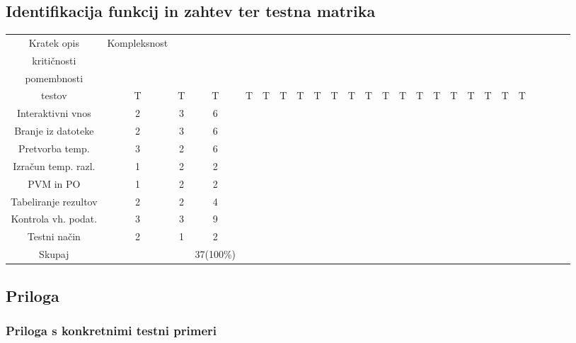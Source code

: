 \documentclass[a4paper,12pt]{article}
\begin{document}
	\begin{landscape}
		\subsection{Identifikacija funkcij in zahtev ter testna matrika}
			\footnotesize
			\centering
			\begin{tabular}{|c|c|c|c|c||c|c|c|c|c|c|c|c|c|c|c|c|c|c|c|c|c|c|c|c|}
			\hline
					Kratek opis&Kompleksnost&\thead{Stopnja \\  kritičnosti}&\thead{Indikator \\ pomembnosti}&\thead{Število \\ testov}
					&T&T&T&T&T&T&T&T&T&T&T&T&T&T&T&T&T&T&T&T\\
			\hline
				Interaktivni vnos&2&3&6&&&&&&&&&&&&&&&&&&&&&\\
				\hline
				Branje iz datoteke&2&3&6&&&&&&&&&&&&&&&&&&&&&\\
				\hline
				Pretvorba temp.&3&2&6&&&&&&&&&&&&&&&&&&&&&\\
				\hline
				Izračun temp. razl.&1&2&2&&&&&&&&&&&&&&&&&&&&&\\
				\hline
				PVM in PO&1&2&2&&&&&&&&&&&&&&&&&&&&&\\
				\hline
				Tabeliranje rezultov&2&2&4&&&&&&&&&&&&&&&&&&&&&\\
				\hline
				Kontrola vh. podat.&3&3&9&&&&&&&&&&&&&&&&&&&&&\\
				\hline
				Testni način&2&1&2&&&&&&&&&&&&&&&&&&&&&\\
				\hline
					Skupaj&&&37(100\%)&&&&&&&&&&&&&&&&&&&&&\\
			\hline

		\end{tabular}

	\end{landscape}
\newpage
		\subsection{Priloga}



			\subsubsection{Priloga s konkretnimi testni primeri}
\end{document}
